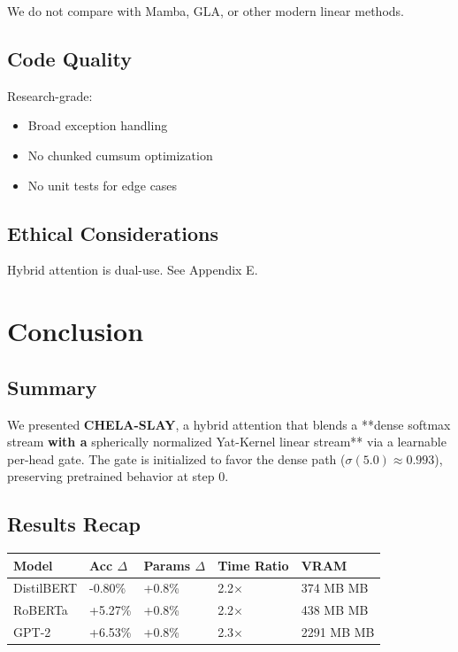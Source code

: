We do not compare with Mamba, GLA, or other modern linear methods.

\subsection{Code Quality}

Research-grade:
\begin{itemize}
\item Broad exception handling
\item No chunked cumsum optimization
\item No unit tests for edge cases

\end{itemize}
\subsection{Ethical Considerations}

Hybrid attention is dual-use. See Appendix E.



\section{Conclusion}

\subsection{Summary}

We presented \textbf{CHELA-SLAY}, a hybrid attention that blends a **dense softmax 
stream\textbf{ with a }spherically normalized Yat-Kernel linear stream** via a 
learnable per-head gate. The gate is initialized to favor the dense path 
($\sigma(5.0) \approx 0.993$), preserving pretrained 
behavior at step 0.

\subsection{Results Recap}

\begin{table}[H]
\centering
\small
\begin{tabular}{lllll}
\toprule
\textbf{Model} & \textbf{Acc $\Delta$} & \textbf{Params $\Delta$} & \textbf{Time Ratio} & \textbf{VRAM} \\
\midrule
DistilBERT & -0.80\% & +0.8\% & 2.2$\times$ & 374 MB MB \\
RoBERTa & +5.27\% & +0.8\% & 2.2$\times$ & 438 MB MB \\
GPT-2 & +6.53\% & +0.8\% & 2.3$\times$ & 2291 MB MB \\
\bottomrule
\end{tabular}
\end{table}

